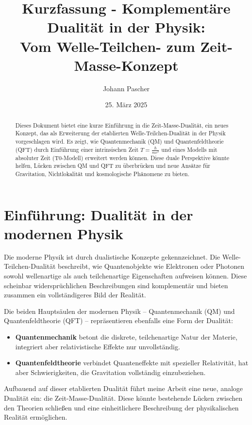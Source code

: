 \documentclass[a4paper,12pt]{article}
\begin{document}
	
	\title{Kurzfassung - Komplementäre Dualität in der Physik: \\ Vom Welle-Teilchen- zum Zeit-Masse-Konzept}
	\author{Johann Pascher}
	\date{25. März 2025}
	\maketitle
	
	\begin{abstract}
		Dieses Dokument bietet eine kurze Einführung in die Zeit-Masse-Dualität, ein neues Konzept, das als Erweiterung der etablierten Welle-Teilchen-Dualität in der Physik vorgeschlagen wird. Es zeigt, wie Quantenmechanik (QM) und Quantenfeldtheorie (QFT) durch Einführung einer intrinsischen Zeit \( T = \frac{\hbar}{mc^2} \) und eines Modells mit absoluter Zeit (T0-Modell) erweitert werden können. Diese duale Perspektive könnte helfen, Lücken zwischen QM und QFT zu überbrücken und neue Ansätze für Gravitation, Nichtlokalität und kosmologische Phänomene zu bieten.
	\end{abstract}
	
	\tableofcontents
	\newpage
	
	\section{Einführung: Dualität in der modernen Physik}
	
	Die moderne Physik ist durch dualistische Konzepte gekennzeichnet. Die Welle-Teilchen-Dualität beschreibt, wie Quantenobjekte wie Elektronen oder Photonen sowohl wellenartige als auch teilchenartige Eigenschaften aufweisen können. Diese scheinbar widersprüchlichen Beschreibungen sind komplementär und bieten zusammen ein vollständigeres Bild der Realität.
	
	Die beiden Hauptsäulen der modernen Physik – Quantenmechanik (QM) und Quantenfeldtheorie (QFT) – repräsentieren ebenfalls eine Form der Dualität:
	\begin{itemize}
		\item \textbf{Quantenmechanik} betont die diskrete, teilchenartige Natur der Materie, integriert aber relativistische Effekte nur unvollständig.
		\item \textbf{Quantenfeldtheorie} verbindet Quanteneffekte mit spezieller Relativität, hat aber Schwierigkeiten, die Gravitation vollständig einzubeziehen.
	\end{itemize}
	
	Aufbauend auf dieser etablierten Dualität führt meine Arbeit \cite{pascher_planck_2025} eine neue, analoge Dualität ein: die Zeit-Masse-Dualität. Diese könnte bestehende Lücken zwischen den Theorien schließen und eine einheitlichere Beschreibung der physikalischen Realität ermöglichen.
	
\end{document}
